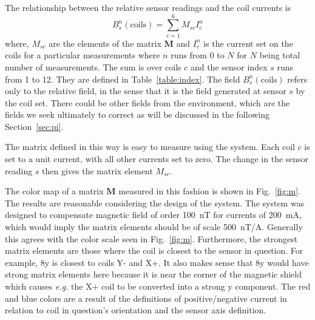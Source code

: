 The relationship between the relative sensor readings and the coil currents is
\begin{equation}\label{eq:B_coils}
    B_s^n(\mathrm{coils})=\sum_{c=1}^{6} M_{sc} I_c^n
\end{equation}
where, $M_{sc}$ are the elements of the matrix $\bm{M}$ and $I_c^n$ is the current set on the coils for a particular measurements where $n$ runs from 0 to $N$ for $N$ being total number of measurements. The sum is over coils $c$ and the sensor index $s$ runs from 1 to 12. They are defined in Table~\ref{table:index}. The field $B_s^n(\mathrm{coils})$ refers only to the relative field, in the sense that it is the field generated at sensor $s$ by the coil set. There could be other fields from the environment, which are the fields we seek ultimately to correct as will be discussed in the following Section~\ref{sec:pi}.






The matrix defined in this way is easy to measure using the system.  Each coil $c$ is set to a unit current, with all other currents set to zero.  The change in the sensor reading $s$ then gives the matrix element $M_{sc}$. 



The color map of a matrix $\bm{M}$ measured in this fashion is shown in Fig.~\ref{fig:m}.  The results are reasonable considering the design of the system.  The system was designed to compensate magnetic field of order 100~nT for currents of 200~mA, which would imply the matrix elements should be of scale 500~nT/A.  Generally this agrees with the color scale seen in Fig.~\ref{fig:m}.  Furthermore, the strongest matrix elements are those where the coil is closest to the sensor in question.  For example, 8y is closest to coils Y- and X+.  It also makes sense that 8y would have strong matrix elements here because it is near the corner of the magnetic shield which causes {\it e.g.} the X+ coil to be converted into a strong y component.  The red and blue colors are a result of the definitions of positive/negative current in relation to coil in question's orientation and the sensor axis definition.



